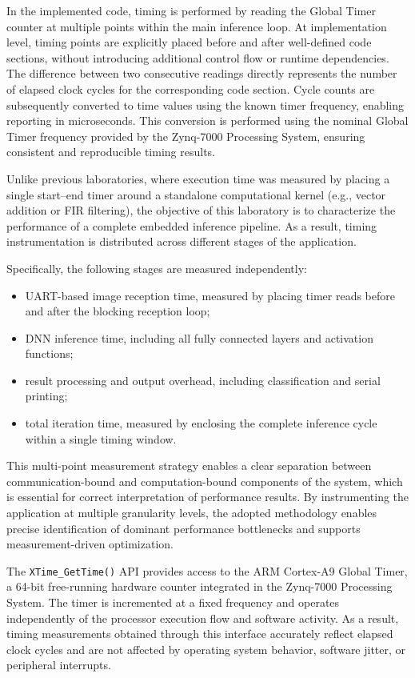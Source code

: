 In the implemented code, timing is performed by reading the Global Timer counter
at multiple points within the main inference loop.
At implementation level, timing points are explicitly placed before and after
well-defined code sections, without introducing additional control flow or
runtime dependencies.
The difference between two consecutive readings directly represents the number of
elapsed clock cycles for the corresponding code section.
Cycle counts are subsequently converted to time values using the known timer
frequency, enabling reporting in microseconds.
This conversion is performed using the nominal Global Timer frequency provided
by the Zynq-7000 Processing System, ensuring consistent and reproducible timing
results.


Unlike previous laboratories, where execution time was measured by placing a
single start--end timer around a standalone computational kernel (e.g., vector
addition or FIR filtering), the objective of this laboratory is to characterize
the performance of a complete embedded inference pipeline.
As a result, timing instrumentation is distributed across different stages of
the application.

Specifically, the following stages are measured independently:
\begin{itemize}
    \item UART-based image reception time, measured by placing timer reads before
          and after the blocking reception loop;
    \item DNN inference time, including all fully connected layers and activation
          functions;
    \item result processing and output overhead, including classification and
          serial printing;
    \item total iteration time, measured by enclosing the complete inference
          cycle within a single timing window.
\end{itemize}

This multi-point measurement strategy enables a clear separation between
communication-bound and computation-bound components of the system, which is
essential for correct interpretation of performance results.
By instrumenting the application at multiple granularity levels, the adopted
methodology enables precise identification of dominant performance bottlenecks
and supports measurement-driven optimization.

The \texttt{XTime\_GetTime()} API provides access to the ARM Cortex-A9 Global Timer,
a 64-bit free-running hardware counter integrated in the Zynq-7000 Processing
System.
The timer is incremented at a fixed frequency and operates independently of the
processor execution flow and software activity.
As a result, timing measurements obtained through this interface accurately
reflect elapsed clock cycles and are not affected by operating system behavior,
software jitter, or peripheral interrupts.

